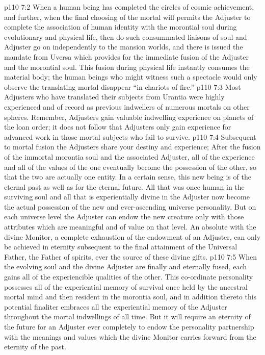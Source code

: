 \vs p110 7:2 When a human being has completed the circles of cosmic achievement, and further, when the final choosing of the mortal will permits the Adjuster to complete the association of human identity with the morontial soul during evolutionary and physical life, then do such consummated liaisons of soul and Adjuster go on independently to the mansion worlds, and there is issued the mandate from Uversa which provides for the immediate fusion of the Adjuster and the morontial soul. This fusion during physical life instantly consumes the material body; the human beings who might witness such a spectacle would only observe the translating mortal disappear “in chariots of fire.”
\vs p110 7:3 Most Adjusters who have translated their subjects from Urantia were highly experienced and of record as previous indwellers of numerous mortals on other spheres. Remember, Adjusters gain valuable indwelling experience on planets of the loan order; it does not follow that Adjusters only gain experience for advanced work in those mortal subjects who fail to survive.
\vs p110 7:4 \pc Subsequent to mortal fusion the Adjusters share your destiny and experience;  After the fusion of the immortal morontia soul and the associated Adjuster, all of the experience and all of the values of the one eventually become the possession of the other, so that the two are actually one entity. In a certain sense, this new being is of the eternal past as well as for the eternal future. All that was once human in the surviving soul and all that is experientially divine in the Adjuster now become the actual possession of the new and ever\hyp{}ascending universe personality. But on each universe level the Adjuster can endow the new creature only with those attributes which are meaningful and of value on that level. An absolute  with the divine Monitor, a complete exhaustion of the endowment of an Adjuster, can only be achieved in eternity subsequent to the final attainment of the Universal Father, the Father of spirits, ever the source of these divine gifts.
\vs p110 7:5 When the evolving soul and the divine Adjuster are finally and eternally fused, each gains all of the experiencible qualities of the other. This co\hyp{}ordinate personality possesses all of the experiential memory of survival once held by the ancestral mortal mind and then resident in the morontia soul, and in addition thereto this potential finaliter embraces all the experiential memory of the Adjuster throughout the mortal indwellings of all time. But it will require an eternity of the future for an Adjuster ever completely to endow the personality partnership with the meanings and values which the divine Monitor carries forward from the eternity of the past.
